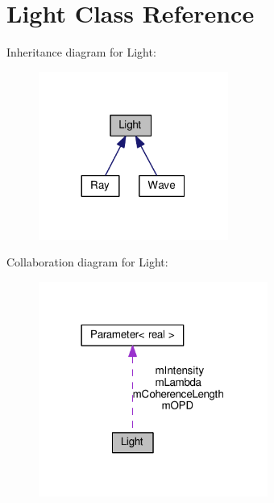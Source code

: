 \hypertarget{classLight}{}\section{Light Class Reference}
\label{classLight}


Inheritance diagram for Light\+:\nopagebreak
\begin{figure}[H]
\begin{center}
\leavevmode
\includegraphics[width=176pt]{classLight__inherit__graph}
\end{center}
\end{figure}


Collaboration diagram for Light\+:\nopagebreak
\begin{figure}[H]
\begin{center}
\leavevmode
\includegraphics[width=213pt]{classLight__coll__graph}
\end{center}
\end{figure}
